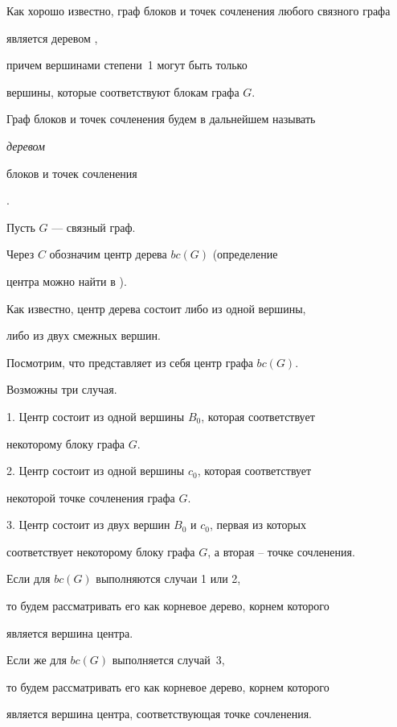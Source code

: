 Как хорошо известно, граф блоков и точек сочленения любого связного графа


является деревом \cite{Minsk},


причем вершинами степени~1 могут быть только


вершины, которые соответствуют блокам графа $G$.


Граф блоков и точек сочленения будем в дальнейшем называть {\it деревом


блоков и точек сочленения}.





Пусть $G$ --- связный граф.


Через $C$ обозначим центр дерева $bc(G)$ (определение


центра можно найти в \cite{tree}).


Как известно, центр дерева состоит либо из одной вершины,


либо из двух смежных вершин.


Посмотрим, что представляет из себя центр графа $bc(G)$.


Возможны три случая.





1. Центр состоит из одной вершины $B_0$, которая соответствует


некоторому блоку графа $G$.





2. Центр состоит из одной вершины $c_0$, которая соответствует


некоторой точке сочленения графа $G$.





3. Центр состоит из двух вершин $B_0$ и $c_0$, первая из которых


соответствует некоторому блоку графа $G$, а вторая -- точке сочленения.





Если для $bc(G)$ выполняются случаи 1 или 2,


то будем рассматривать его как корневое дерево, корнем которого


является вершина центра.


Если же для $bc(G)$ выполняется случай~3,


то будем рассматривать его как корневое дерево, корнем которого


является вершина центра, соответствующая точке сочленения.





